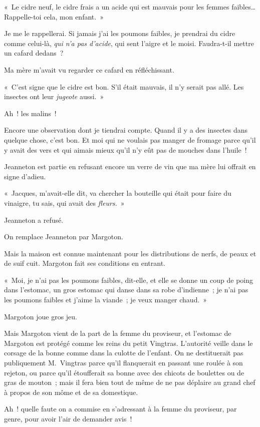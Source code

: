 \documentclass[french,twoside]{book} %
\begin{document}
« Le cidre neuf, le cidre frais a un acide qui est mauvais pour les femmes faibles… Rappelle-toi cela, mon enfant. »\par
Je me le rappellerai. Si jamais j’ai les poumons faibles, je prendrai du cidre comme celui-là, \emph{qui n’a pas d’acide}, qui sent l’aigre et le moisi. Faudra-t-il mettre un cafard dedans ?\par
Ma mère m’avait vu regarder ce cafard en réfléchissant.\par
« C’est signe que le cidre est bon. S’il était mauvais, il n’y serait pas allé. Les insectes ont leur\emph{ jugeote} aussi. »\par
Ah ! les malins !\par
Encore une observation dont je tiendrai compte. Quand il y a des insectes dans quelque chose, c’est bon. Et moi qui ne voulais pas manger de fromage parce qu’il y avait des vers et qui aimais mieux qu’il n’y eût pas de mouches dans l’huile !\par
Jeanneton est partie en refusant encore un verre de vin que ma mère lui offrait en signe d’adieu.\par
« Jacques, m’avait-elle dit, va chercher la bouteille qui était pour faire du vinaigre, tu sais, qui avait des\emph{ fleurs.} »\par
Jeanneton a refusé.\par
On remplace Jeanneton par Margoton.\par
Mais la maison est connue maintenant pour les distributions de nerfs, de peaux et de suif cuit. Margoton fait ses conditions en entrant.\par
« Moi, je n’ai pas les poumons faibles, dit-elle, et elle se donne un coup de poing dans l’estomac, un gros estomac qui danse dans sa robe d’indienne ; je n’ai pas les poumons faibles et j’aime la viande ; je veux manger chaud. »\par
\bigbreak
\noindent Margoton joue gros jeu.\par
Mais Margoton vient de la part de la femme du proviseur, et l’estomac de Margoton est protégé comme les reins du petit Vingtras. L’autorité veille dans le corsage de la bonne comme dans la culotte de l’enfant. On ne destituerait pas publiquement M. Vingtras parce qu’il flanquerait en passant une roulée à son rejeton, ou parce qu’il étoufferait sa bonne avec des chicots de boulettes ou de gras de mouton ; mais il fera bien tout de même de ne pas déplaire au grand chef à propos de son môme et de sa domestique.\par
Ah ! quelle faute on a commise en s’adressant à la femme du proviseur, par genre, pour avoir l’air de demander avis !\par
\end{document}
